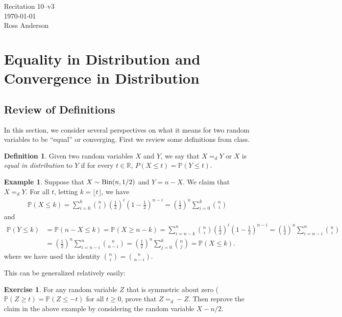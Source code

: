 \documentclass{article}
\theoremstyle{definition}
\newtheorem{definition}{Definition}
\newtheorem{example}{Example}
\newtheorem{exercise}{Exercise}
\newcommand{\Bin}{\mathop{\text{\rm Bin}}}
\renewcommand{\P}{\mathbb P}
\newcommand{\1}{\mathbb I}
\newcommand{\R}{\mathbb R}
\begin{document}
\begin{flushright}
  Recitation 10--v3\\
  \today\\
  Ross Anderson
\end{flushright}

\section{Equality in Distribution and Convergence in Distribution}

\subsection{Review of Definitions}

In this section, we consider several perspectives on what it means for
two random variables to be ``equal'' or converging.  First we review
some definitions from class.
\begin{definition}
  Given two random variables $X$ and $Y$, we say that $X =_d Y$ or $X$
  is \emph{equal in distribution} to $Y$ if for every $t \in \R$, $P(X \leq
  t) = \P(Y \leq t)$.
\end{definition}
\begin{small}  
\begin{example}
  Suppose that $X \sim \Bin(n,1/2)$ and $Y = n-X$.  We claim that $X =_d Y$.  For all $t$,
  letting $k = \lfloor t \rfloor$, we have
  \begin{align*}
    \P(X \leq k) = \sum_{i=0}^k \binom n i \left(\frac{1}{2}\right)^i
    \left(1 - \frac 12\right)^{n-i} =\left(\frac{1}{2}\right)^n
    \sum_{i=0}^k \binom n i
  \end{align*}
  and
  \begin{align*}
    \P(Y \leq k) &= \P(n-X \leq k) =\P(X \geq n- k) = \sum_{i=n-k}^n
    \binom n i \left(\frac{1}{2}\right)^i \left(1 - \frac
      12\right)^{n-i} =\left(\frac{1}{2}\right)^n \sum_{i=n-i}^n
    \binom n i\\
    &= \left(\frac{1}{2}\right)^n \sum_{i=n-i}^n \binom {n}
    {n-i} = \left(\frac{1}{2}\right)^n \sum_{j=0}^k \binom {n} {j} = \P(X \leq k).
  \end{align*}
  where we have used the identity $\binom{n}{i} = \binom{n}{n-i}$.
\end{example}
\end{small}
This can be generalized relatively easily:
\begin{exercise}
  For any random variable $Z$ that is symmetric about zero ($\P(Z \geq
  t) = \P(Z \leq -t)$ for all $t \geq 0$, prove that $Z =_d -Z$.  Then
  reprove the claim in the above example by considering the random
  variable $X - n/2$.  
\end{exercise}
\end{document}
